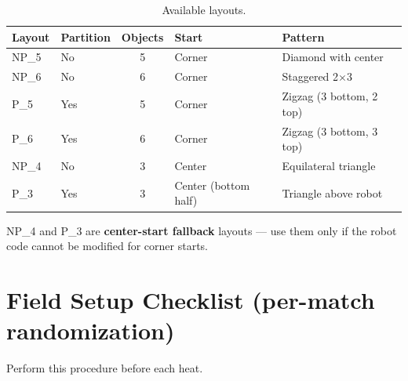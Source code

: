 \documentclass[a4]{article}
\begin{document}
\begin{table}[H]
\centering
\begin{tabular}{llcll}
\toprule
\textbf{Layout} & \textbf{Partition} & \textbf{Objects} & \textbf{Start} & \textbf{Pattern} \\
\midrule
NP\_5 & No & 5 & Corner & Diamond with center \\
NP\_6 & No & 6 & Corner & Staggered 2$\times$3 \\
P\_5 & Yes & 5 & Corner & Zigzag (3 bottom, 2 top) \\
P\_6 & Yes & 6 & Corner & Zigzag (3 bottom, 3 top) \\
NP\_4 & No & 3 & Center & Equilateral triangle \\
P\_3 & Yes & 3 & Center (bottom half) & Triangle above robot \\
\bottomrule
\end{tabular}
\caption{Available layouts.}
\end{table}

NP\_4 and P\_3 are \textbf{center-start fallback} layouts --- use them only if the robot code cannot be modified for corner starts.

\pagebreak
\section*{Field Setup Checklist (per-match randomization)}

Perform this procedure before each heat.
\end{document}
